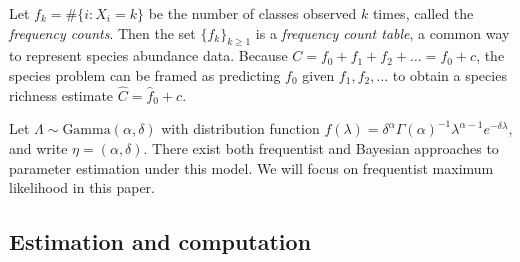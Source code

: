 \documentclass[12pt]{article}
\theoremstyle{break}
\theoremstyle{break}
\begin{document}
Let $f_k = \#\{i: X_i = k\}$ be the number of classes observed $k$ times, called the \textit{frequency counts}.  Then the set $\{f_k\}_{k \geq 1}$ is a \textit{frequency count table}, a common way to represent species abundance data. Because $C = f_0 + f_1 + f_2 + \dots = f_0 + c$, the species problem can be framed as predicting $f_0$ given $f_1, f_2, \ldots$ to obtain a species richness estimate $\hat{C} = \hat{f}_0 + c$.

Let $\Lambda \sim \text{Gamma}(\alpha, \delta)$ with distribution function $f(\lambda) = \delta^\alpha \Gamma (\alpha)^{-1} \lambda^{\alpha - 1} e^{-\delta \lambda}$, and write $\eta = (\alpha, \delta)$.
%
There exist both frequentist \citep{fisher_1943,chao_2002} and Bayesian \citep{efron_1976,barger_2010} approaches to parameter estimation under this model. We will focus on frequentist maximum likelihood in this paper.

\subsection{Estimation and computation}
\end{document}
